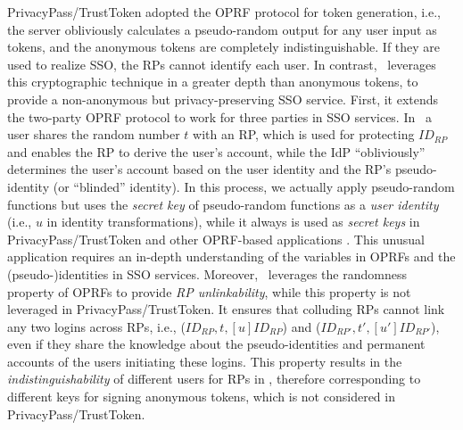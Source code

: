 PrivacyPass/TrustToken adopted the OPRF protocol for token generation, i.e., the server obliviously calculates a pseudo-random output for any user input as tokens,
and the anonymous tokens are completely indistinguishable.
If they are used to realize SSO, the RPs cannot identify each user.
In contrast, \usso\ leverages this cryptographic technique in a greater depth than anonymous tokens,
 to provide a non-anonymous but privacy-preserving SSO service. First, it extends the two-party OPRF protocol to work for three parties in SSO services.
In \usso\ a user shares the random number $t$ with an RP, which is used for protecting $ID_{RP}$ and enables the RP to derive the user's account, %
    while the IdP ``obliviously'' determines the user's account based on the user identity and the RP's pseudo-identity (or ``blinded'' identity).
In this process, we actually apply pseudo-random functions but uses the \emph{secret key} of pseudo-random functions as a \emph{user identity} (i.e., $u$ in identity transformations),
    while it always is used as \emph{secret keys} in PrivacyPass/TrustToken and other OPRF-based applications \cite{privacypass,trusttoken,strong-oprf,oprf-bitcoin-wallet,pesto,oprf-ot-si,pp-ss,Private-Contact-Discovery,o-kms,oprf-deduplication}.
This unusual application requires an in-depth understanding of the variables in OPRFs and the (pseudo-)identities in SSO services.
Moreover, \usso\ leverages the randomness property of OPRFs
 to provide \emph{RP unlinkability}, while this property is not leveraged in PrivacyPass/TrustToken.
It ensures that colluding RPs cannot link any two logins across RPs, i.e., ($ID_{RP}, t, [u]ID_{RP}$) and ($ID_{RP'}, t', [u']ID_{RP'}$),
  even if they share the knowledge about the pseudo-identities and permanent accounts of the users initiating these logins.
This property results in the \emph{indistinguishability} of different users for RPs in \usso,
    therefore corresponding to different keys for signing anonymous tokens,
    which is not considered in PrivacyPass/TrustToken.

